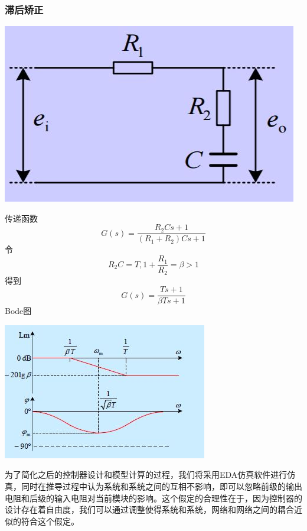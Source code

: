 \documentclass[UTF8,a4paper]{ctexart}
\begin{document}
\begin{multicols}{2}
\subsubsection{滞后矫正}
\begin{figurehere}
\centering
\includegraphics[width=\columnwidth]{pi.jpg}
\end{figurehere}
传递函数
\begin{equation}
G(s)=\frac{R_2Cs+1}{(R_1+R_2)Cs+1}
\end{equation}
令
$$R_2C=T,1+\frac{R_1}{R_2}=\beta>1$$
得到
\begin{equation}
G(s)=\frac{Ts+1}{\beta Ts+1}
\end{equation}
Bode图

\begin{figurehere}
\centering
\includegraphics[width=\columnwidth]{bodepi.jpg}
\end{figurehere}
\end{multicols}

为了简化之后的控制器设计和模型计算的过程，我们将采用EDA仿真软件进行仿真，同时在推导过程中认为系统和系统之间的互相不影响，即可以忽略前级的输出电阻和后级的输入电阻对当前模块的影响。这个假定的合理性在于，因为控制器的设计存在着自由度，我们可以通过调整使得系统和系统，网络和网络之间的耦合近似的符合这个假定。
\end{document}
